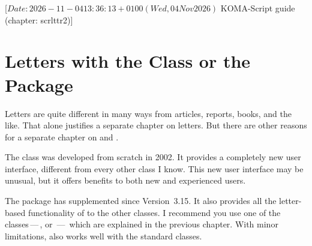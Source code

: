 %
%
%
%
%
%
%

%
                 [$Date: 2026-11-04 13:36:13 +0100 (Wed, 04 Nov 2026) $
                  KOMA-Script guide (chapter: scrlttr2)]


\chapter{Letters with the  Class or the 
  Package}

\BeginIndexGroup
{}%
%
Letters are quite different in many ways from articles, reports, books, and
the like. That alone justifies a separate chapter on letters. But there are
other reasons for a separate chapter on  and
.

The  class was developed from
scratch in 2002. It provides a completely new user interface, different from
every other class I know. This new user interface may be unusual, but it
offers benefits to both new and experienced {\KOMAScript} users.

The %
 package has supplemented \KOMAScript{}
since Version~3.15. It also provides all the letter-based functionality of
 to the other classes. I recommend you use one of the
\KOMAScript{} classes\,---\,,  or
\,---\, which are explained in the previous chapter. With
minor limitations,  also works well with the standard
classes.


